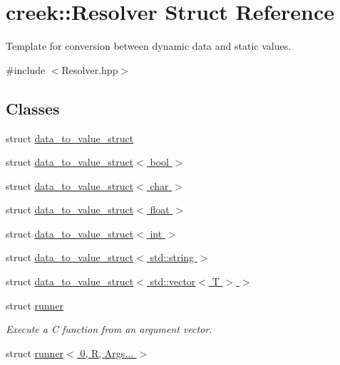 \hypertarget{structcreek_1_1_resolver}{}\section{creek\+:\+:Resolver Struct Reference}
\label{structcreek_1_1_resolver}


Template for conversion between dynamic data and static values.  




{\ttfamily \#include $<$Resolver.\+hpp$>$}

\subsection*{Classes}
\begin{DoxyCompactItemize}
\item 
struct \hyperlink{structcreek_1_1_resolver_1_1data__to__value__struct}{data\+\_\+to\+\_\+value\+\_\+struct}
\item 
struct \hyperlink{structcreek_1_1_resolver_1_1data__to__value__struct_3_01bool_01_4}{data\+\_\+to\+\_\+value\+\_\+struct$<$ bool $>$}
\item 
struct \hyperlink{structcreek_1_1_resolver_1_1data__to__value__struct_3_01char_01_4}{data\+\_\+to\+\_\+value\+\_\+struct$<$ char $>$}
\item 
struct \hyperlink{structcreek_1_1_resolver_1_1data__to__value__struct_3_01float_01_4}{data\+\_\+to\+\_\+value\+\_\+struct$<$ float $>$}
\item 
struct \hyperlink{structcreek_1_1_resolver_1_1data__to__value__struct_3_01int_01_4}{data\+\_\+to\+\_\+value\+\_\+struct$<$ int $>$}
\item 
struct \hyperlink{structcreek_1_1_resolver_1_1data__to__value__struct_3_01std_1_1string_01_4}{data\+\_\+to\+\_\+value\+\_\+struct$<$ std\+::string $>$}
\item 
struct \hyperlink{structcreek_1_1_resolver_1_1data__to__value__struct_3_01std_1_1vector_3_01_t_01_4_01_4}{data\+\_\+to\+\_\+value\+\_\+struct$<$ std\+::vector$<$ T $>$ $>$}
\item 
struct \hyperlink{structcreek_1_1_resolver_1_1runner}{runner}
\begin{DoxyCompactList}\small\item\em Execute a C function from an argument vector. \end{DoxyCompactList}\item 
struct \hyperlink{structcreek_1_1_resolver_1_1runner_3_010_00_01_r_00_01_args_8_8_8_01_4}{runner$<$ 0, R, Args... $>$}

\end{DoxyCompactItemize}
